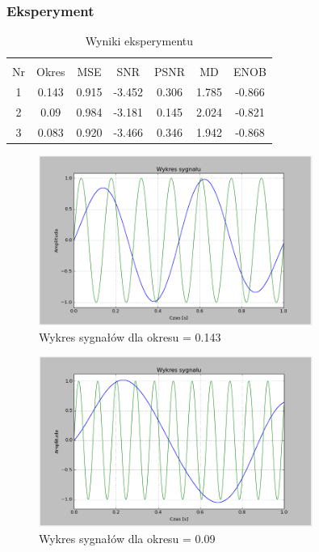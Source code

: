 \documentclass{article}
\begin{document}
    \subsubsection{Eksperyment}

    \begin{table}[h!]
        \centering
        \vspace{0.2cm}
        \begin{tabular}{|c|c|c|c|c|c|c|}
            \hline\hline\\[-0.4cm]
            Nr & Okres & MSE & SNR & PSNR & MD & ENOB  \\
            \hline
            1 & 0.143 & 0.915 & -3.452 & 0.306 & 1.785 & -0.866 \\
            \hline
            2 & 0.09 & 0.984 & -3.181 & 0.145 & 2.024 & -0.821  \\
            \hline
            3 & 0.083 & 0.920 & -3.466 & 0.346 & 1.942 & -0.868   \\
            \hline
        \end{tabular}
        \caption{Wyniki eksperymentu}
    \end{table}
    \FloatBarrier

    \begin{figure}[h!]
        \centering
        \includegraphics[width=0.8\textwidth]{img/1/anti_1.png}
        \caption{Wykres sygnałów dla okresu = 0.143}
    \end{figure}
    \FloatBarrier

    \begin{figure}[h!]
        \centering
        \includegraphics[width=0.8\textwidth]{img/1/anti_2.png}
        \caption{Wykres sygnałów dla okresu = 0.09}
    \end{figure}
    \FloatBarrier
\end{document}
